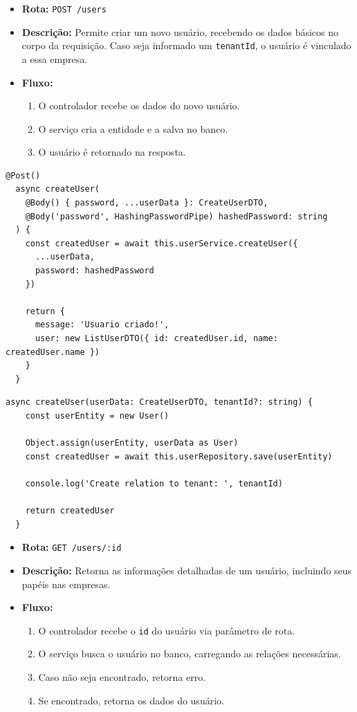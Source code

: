 \begin{itemize}
	\item \textbf{Rota:} \texttt{POST /users}
	\item \textbf{Descrição:} Permite criar um novo usuário, recebendo os dados básicos no corpo da requisição. Caso seja informado um \texttt{tenantId}, o usuário é vinculado a essa empresa.
	\item \textbf{Fluxo:}
	\begin{enumerate}
		\item O controlador recebe os dados do novo usuário.
		\item O serviço cria a entidade e a salva no banco.
		\item O usuário é retornado na resposta.
	\end{enumerate}
\end{itemize}

\begin{lstlisting}[caption={Exemplo de \textit{controller} para criação de usuário.},label={cod:create-user-controller}]
	@Post()
  async createUser(
    @Body() { password, ...userData }: CreateUserDTO,
    @Body('password', HashingPasswordPipe) hashedPassword: string
  ) {
    const createdUser = await this.userService.createUser({
      ...userData,
      password: hashedPassword
    })

    return {
      message: 'Usuario criado!',
      user: new ListUserDTO({ id: createdUser.id, name: createdUser.name })
    }
  }
\end{lstlisting}

\begin{lstlisting}[caption={Exemplo de \textit{service} para criação de usuário.},label={cod:create-user-service}]
	async createUser(userData: CreateUserDTO, tenantId?: string) {
    const userEntity = new User()

    Object.assign(userEntity, userData as User)
    const createdUser = await this.userRepository.save(userEntity)

    console.log('Create relation to tenant: ', tenantId)

    return createdUser
  }
\end{lstlisting}

\begin{itemize}
	\item \textbf{Rota:} \texttt{GET /users/:id}
	\item \textbf{Descrição:} Retorna as informações detalhadas de um usuário, incluindo seus papéis nas empresas.
	\item \textbf{Fluxo:}
	\begin{enumerate}
		\item O controlador recebe o \texttt{id} do usuário via parâmetro de rota.
		\item O serviço busca o usuário no banco, carregando as relações necessárias.
		\item Caso não seja encontrado, retorna erro.
		\item Se encontrado, retorna os dados do usuário.
	\end{enumerate}
\end{itemize}

